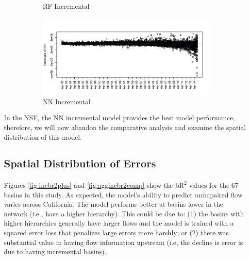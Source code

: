 \begin{figure}
\begin{subfigure}{.5\textwidth}
  		\caption{RF Incremental}
  		\label{fig:restimerf}
	\end{subfigure}%
	\begin{subfigure}{.5\textwidth}
  		\centering
  		\includegraphics[width=\textwidth, trim={0 0 0 1cm}, clip=true]{plots/rplot22_nnlogo_residovertime_inc.png}
  		\caption{NN Incremental}
  		\label{fig:restimenn}
	\end{subfigure}
	\caption{}
	\label{fig:resovertime}
\end{figure}

In the NSE, the NN incremental model provides the best model performance, therefore, we will now abandon the comparative analysis and examine the spatial distribution of this model.
\subsection{Spatial Distribution of Errors}
Figures \ref{fig:incbr2plus} and \ref{fig:aggincbr2comp} show the bR\textsuperscript{2} values for the 67 basins in this study. As expected, the model's ability to predict unimpaired flow varies across California. The model performs better at basins  lower in the network (i.e., have a higher hierarchy). This could be due to: (1) the basins with higher hierarchies generally have larger flows and the model is trained with a squared error loss that penalizes large errors more harshly; or (2) there was substantial value in having flow information upstream (i.e, the decline is error is due to having incremental basins). 

